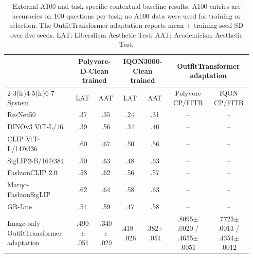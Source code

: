 \begin{table}[htbp]
\caption{External A100 and task-specific contextual baseline results. A100 entries are accuracies on 100 questions per task; no A100 data were used for training or selection. The OutfitTransformer adaptation reports mean $\pm$ training-seed SD over five seeds. LAT: Liberalism Aesthetic Test; AAT: Academicism Aesthetic Test.}
\label{tab:a100baseline}
\centering
\scriptsize
\setlength{\tabcolsep}{4pt}
\begin{tabular}{lcccccc}
\toprule
& \multicolumn{2}{c}{Polyvore-D-Clean trained} & \multicolumn{2}{c}{IQON3000-Clean trained} & \multicolumn{2}{c}{OutfitTransformer adaptation} \\
\cmidrule(lr){2-3}\cmidrule(lr){4-5}\cmidrule(lr){6-7}
System & LAT & AAT & LAT & AAT & Polyvore CP/FITB & IQON CP/FITB \\
\midrule
ResNet50 & .37 & .35 & .24 & .31 & -- & -- \\
DINOv3 ViT-L/16 & .39 & .56 & .34 & .40 & -- & -- \\
CLIP ViT-L/14@336 & .60 & .67 & .50 & .56 & -- & -- \\
SigLIP2-B/16@384 & .50 & .63 & .48 & .63 & -- & -- \\
FashionCLIP 2.0 & .58 & .62 & .56 & .57 & -- & -- \\
Marqo-FashionSigLIP & .62 & .64 & .58 & .63 & -- & -- \\
GR-Lite & .54 & .59 & .47 & .58 & -- & -- \\
Image-only OutfitTransformer adaptation & .490$\pm$.051 & .340$\pm$.029 & .418$\pm$.026 & .382$\pm$.054 & .8095$\pm$.0020 / .4655$\pm$.0051 & .7723$\pm$.0013 / .4354$\pm$.0012 \\
\bottomrule
\end{tabular}
\end{table}
